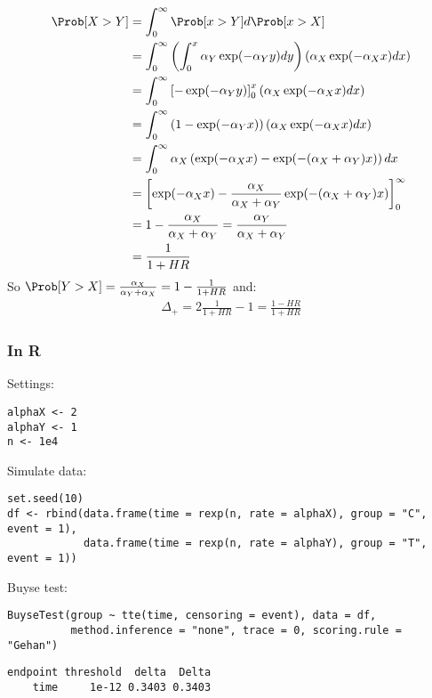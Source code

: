 \documentclass[12pt]{article}
\begin{document}
\bigskip

\begin{align*}
\Prob[X>Y] &= \int_{0}^{\infty} \Prob[x>Y] d\Prob[x>X] \\
 &= \int_{0}^{\infty} \left(\int_0^{x} \alpha_Y \exp(-\alpha_Y y) dy\right) \left( \alpha_X \exp(-\alpha_X x) dx \right) \\
 &= \int_{0}^{\infty} \left[-\exp(-\alpha_Y y) \right]_0^{x} \left( \alpha_X \exp(-\alpha_X x) dx \right) \\
 &= \int_{0}^{\infty} \left(1-\exp(-\alpha_Y x) \right) \left( \alpha_X \exp(-\alpha_X x) dx \right) \\
 &=  \int_{0}^{\infty} \alpha_X \left(\exp(-\alpha_X x)-\exp(-(\alpha_X+\alpha_Y) x)\right)  dx \\
 &=  \left[\exp(-\alpha_X x)- \frac{\alpha_X}{\alpha_X+\alpha_Y} \exp(-(\alpha_X+\alpha_Y) x)\right]_{0}^{\infty} \\
 &=  1 - \frac{\alpha_X}{\alpha_X+\alpha_Y} = \frac{\alpha_Y}{\alpha_X+\alpha_Y}\\
 &=  \frac{1}{1+HR}
\end{align*}
So \(\Prob[Y>X] = \frac{\alpha_X}{\alpha_Y+\alpha_X} = 1-\frac{1}{1+HR}\) and:
\begin{align*}
\Delta_+ = 2\frac{1}{1+HR}-1 = \frac{1-HR}{1+HR}
\end{align*}

\clearpage

\subsubsection{In R}
\label{sec:orgc4a678d}

Settings:
\lstset{language=r,label= ,caption= ,captionpos=b,numbers=none}
\begin{lstlisting}
alphaX <- 2
alphaY <- 1
n <- 1e4
\end{lstlisting}

Simulate data:
\lstset{language=r,label= ,caption= ,captionpos=b,numbers=none}
\begin{lstlisting}
set.seed(10)
df <- rbind(data.frame(time = rexp(n, rate = alphaX), group = "C", event = 1),
			data.frame(time = rexp(n, rate = alphaY), group = "T", event = 1))
\end{lstlisting}

Buyse test:
\lstset{language=r,label= ,caption= ,captionpos=b,numbers=none}
\begin{lstlisting}
BuyseTest(group ~ tte(time, censoring = event), data = df,
		  method.inference = "none", trace = 0, scoring.rule = "Gehan")
\end{lstlisting}
\begin{verbatim}
endpoint threshold  delta  Delta
    time     1e-12 0.3403 0.3403
\end{verbatim}
\end{document}
